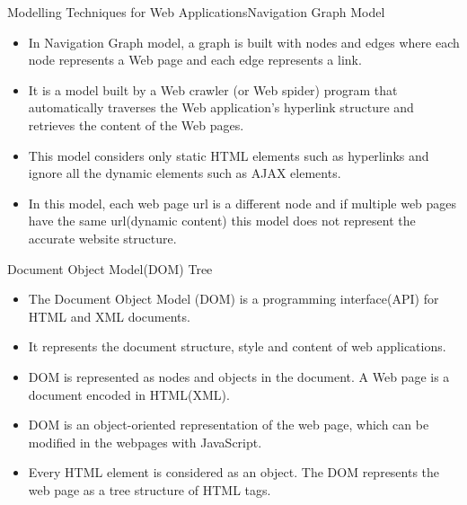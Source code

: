 \documentclass{beamer}
\begin{document}
\begin{frame}{Modelling Techniques for Web Applications\newline \newline Navigation Graph Model}

\begin{itemize}
    \item In Navigation Graph model, a graph is built with nodes and edges where each node represents a Web page and each edge represents a link.
    \item It is a model built by a Web crawler (or Web spider) program that automatically traverses the Web application’s hyperlink structure and retrieves the content of the Web pages.
    \item This model considers only static HTML elements such as hyperlinks and ignore all the dynamic elements such as AJAX elements.
    \item In this model, each web page url is a different node and if multiple web pages have the same url(dynamic content) this model does not represent the accurate website structure. 
\end{itemize}
    
\end{frame}

\begin{frame}{Document Object Model(DOM) Tree}
\begin{itemize}
    \item The Document Object Model (DOM) is a programming interface(API) for HTML and XML documents. 
    \item It represents the document structure, style and content of web applications.
    \item DOM is represented as nodes and objects in the document. A Web page is a document encoded in HTML(XML). 
    \item DOM is an object-oriented representation of the web page, which can be modified in the webpages with JavaScript.
    \item Every HTML element is considered as an object. The DOM represents the web page as a tree structure of HTML tags.
\end{itemize}
\end{frame}
\end{document}
